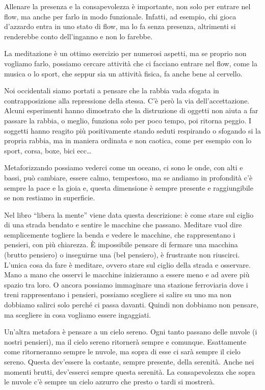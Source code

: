 \documentclass[12pt]{book} %
\begin{document}
\begin{mdframed}[linewidth=1pt]
Allenare la presenza e la consapevolezza è importante, non solo per entrare nel flow, ma anche per farlo in modo
funzionale. Infatti, ad esempio, chi gioca d'azzardo entra in uno stato di flow, ma lo fa senza
presenza, altrimenti si renderebbe conto dell'inganno e non lo farebbe.

La meditazione è un ottimo esercizio per numerosi aspetti, ma se proprio non vogliamo farlo, possiamo cercare attività
che ci facciano entrare nel flow, come la musica o lo sport, che seppur sia un attività fisica, fa anche bene al
cervello.
\end{mdframed}

Noi occidentali siamo portati a pensare che la rabbia vada sfogata in contrapposizione alla repressione della stessa.
C'è però la via dell'accettazione. Alcuni esperimenti hanno dimostrato che la
distruzione di oggetti non aiuta a far passare la rabbia, o meglio, funziona solo per poco tempo, poi ritorna peggio. I
soggetti hanno reagito più positivamente stando seduti respirando o sfogando si la propria rabbia, ma in maniera
ordinata e non caotica, come per esempio con lo sport, corsa, boxe, bici ecc… 

Metaforizzando possiamo vederci come un oceano, ci sono le onde, con alti e bassi, può cambiare, essere calmo,
tempestoso, ma se andiamo in profondità c'è sempre la pace e la gioia e, questa dimensione è sempre presente e
raggiungibile se non restiamo in superficie.

Nel libro “libera la mente” viene data questa descrizione: è come stare sul ciglio di una strada bendato e sentire le
macchine che passano. Meditare vuol dire semplicemente togliere la benda e vedere le macchine, che rappresentano i
pensieri, con più chiarezza. È impossibile pensare di fermare una macchina (brutto pensiero) o inseguirne una (bel
pensiero), è frustrante non riuscirci. L{}'unica cosa da fare è meditare, ovvero stare sul ciglio della strada e
osservare. Mano a mano che osservi le macchine inizieranno a essere meno e ad avere più spazio tra loro.
O ancora possiamo immaginare una stazione ferroviaria dove i treni rappresentano i pensieri, possiamo scegliere si salire su uno ma non dobbiamo salirci solo perché ci passa davanti. Quindi non dobbiamo non pensare, ma scegliere in cosa vogliamo essere ingaggiati.

Un'altra metafora è pensare a un cielo sereno. Ogni tanto passano delle nuvole (i nostri pensieri),
ma il cielo sereno ritornerà sempre e comunque. Esattamente come ritorneranno sempre le nuvole, ma sopra di esse ci
sarà sempre il cielo sereno. Questa dev'essere la costante, sempre presente, della serenità. Anche nei momenti brutti,
dev'esserci sempre questa serenità. La consapevolezza che sopra le nuvole c'è sempre un cielo azzurro che presto o
tardi si mostrerà.
\end{document}
